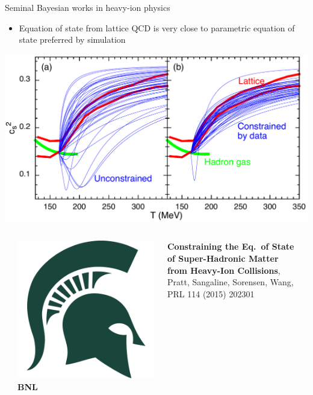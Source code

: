 \documentclass{beamer}
\begin{document}
\begin{frame}{Seminal Bayesian works in heavy-ion physics}
  \begin{itemize}
    \item Equation of state from lattice QCD is very close to parametric equation of state preferred by simulation
  \end{itemize}
  \begin{center}
    \includegraphics[width=.8\textwidth]{priorvpost50}
  \end{center}
  \begin{columns}[T]
    \begin{column}{0.025\textwidth}
    \end{column}
    \begin{column}{0.05\textwidth}
      \raggedleft
      \includegraphics[width=\columnwidth]{michigan-state}\\[-0.5ex]
      \textbf{\small BNL}
    \end{column}
    \begin{column}{0.9\textwidth}
      \scriptsize {}
      \textbf{Constraining the Eq.\ of State of Super-Hadronic Matter from Heavy-Ion Collisions}, Pratt, Sangaline, Sorensen, Wang, PRL 114 (2015) 202301
    \end{column}
    \begin{column}{0.025\textwidth}
    \end{column}
  \end{columns}


\end{frame}
\end{document}
